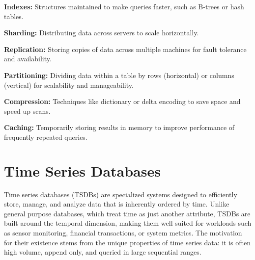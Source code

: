 \textbf{Indexes:} Structures maintained to make queries faster, such as B-trees
or hash tables.

\textbf{Sharding:} Distributing data across servers to scale horizontally.

\textbf{Replication:} Storing copies of data across multiple machines for fault
tolerance and availability.

\textbf{Partitioning:} Dividing data within a table by rows (horizontal) or
columns (vertical) for scalability and manageability.

\textbf{Compression:} Techniques like dictionary or delta encoding to save
space and speed up scans.

\textbf{Caching:} Temporarily storing results in memory to improve performance
of frequently repeated queries.





\section{Time Series Databases}\label{sec:time-series-databases}

Time series databases (TSDBs) are specialized systems designed to efficiently
store, manage, and analyze data that is inherently ordered by time. Unlike
general purpose databases, which treat time as just another attribute, TSDBs
are built around the temporal dimension, making them well suited for workloads
such as sensor monitoring, financial transactions, or system
metrics\cite{Bader2017}. The motivation for their existence stems from the
unique properties of time series data: it is often high volume, append only,
and queried in large sequential ranges.

